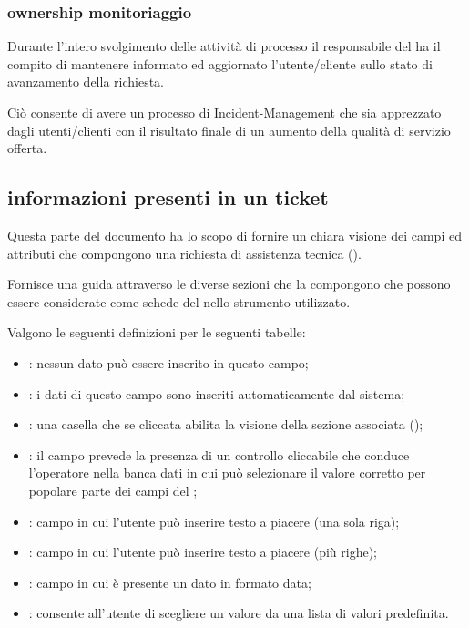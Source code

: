 \subsubsection[Ownership Monitoraggio]{ownership monitoriaggio}
Durante l'intero svolgimento delle attività di processo il responsabile del  ha il compito di mantenere informato ed aggiornato l'utente/cliente sullo stato di avanzamento della richiesta.

Ciò consente di avere un processo di \ac{Incident-Management} che sia apprezzato dagli utenti/clienti con il risultato finale di un aumento della qualità di servizio offerta.

\subsection[Informazioni presenti in un ticket]{informazioni presenti in un ticket}
\label{prc-incicent-ticket}
Questa parte del documento ha lo scopo di fornire un chiara visione dei campi ed attributi che compongono una richiesta di assistenza tecnica ().

Fornisce una guida attraverso le diverse sezioni che la compongono che possono essere considerate come schede del  nello strumento utilizzato.

Valgono le seguenti definizioni per le seguenti tabelle:

\begin{itemize}
\item{: nessun dato può essere inserito in questo campo;}
\item{: i dati di questo campo sono inseriti automaticamente dal sistema;}
\item{: una casella che se cliccata abilita la visione della sezione associata ();}
\item{: il campo prevede la presenza di un controllo cliccabile che conduce l'operatore nella banca dati in cui può selezionare il valore corretto per popolare parte dei campi del ;}
\item{: campo in cui l'utente può inserire testo a piacere (una sola riga);}
\item{: campo in cui l'utente può inserire testo a piacere (più righe);}
\item{: campo in cui è presente un dato in formato data;}
\item{: consente all'utente di scegliere un valore da una lista di valori predefinita.}
\end{itemize}

